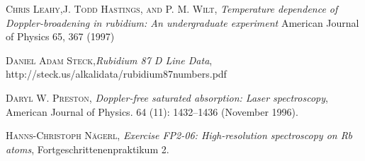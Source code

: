 \documentclass[a4paper,10pt]{article}
\begin{document}
\begin{thebibliography}{99}
\textsc{Chris Leahy,J. Todd Hastings, and P. M. Wilt}, \textit{Temperature dependence of Doppler-broadening in rubidium: An undergraduate experiment} American Journal of Physics 65, 367 (1997)

 \textsc{Daniel Adam Steck},\textit{Rubidium 87 D Line Data}, http://steck.us/alkalidata/rubidium87numbers.pdf
 
\textsc{Daryl W. Preston}, \textit{Doppler-free saturated absorption: Laser spectroscopy}, American Journal of Physics. 64 (11): 1432–1436 (November 1996).

\textsc{Hanns-Christoph N{\"a}gerl}, \textit{Exercise FP2-06: High-resolution spectroscopy on Rb atoms}, Fortgeschrittenenpraktikum 2.
\end{thebibliography}
\end{document}

